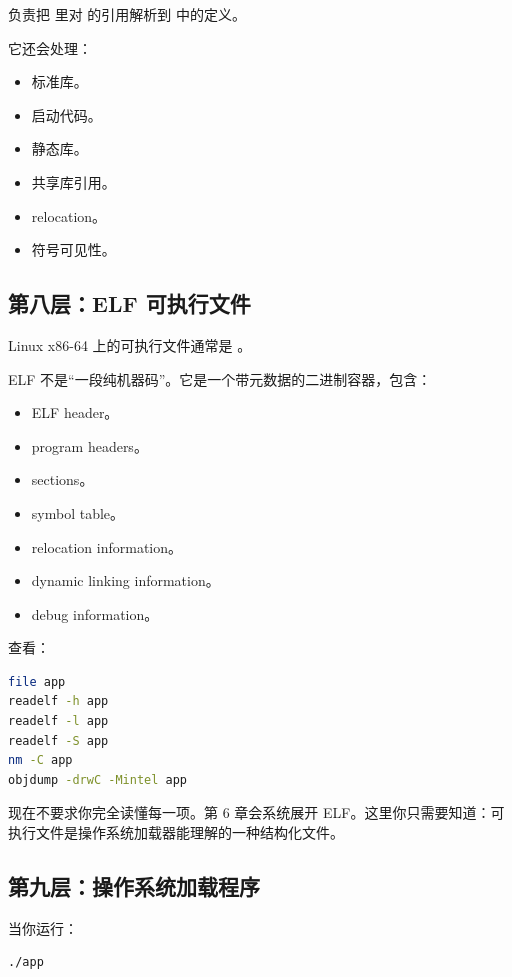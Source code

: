  负责把  里对  的引用解析到  中的定义。

它还会处理：

\begin{itemize}
  \item 标准库。
  \item 启动代码。
  \item 静态库。
  \item 共享库引用。
  \item relocation。
  \item 符号可见性。
\end{itemize}

\subsection{第八层：ELF 可执行文件}

Linux x86-64 上的可执行文件通常是 。

ELF 不是“一段纯机器码”。它是一个带元数据的二进制容器，包含：

\begin{itemize}
  \item ELF header。
  \item program headers。
  \item sections。
  \item symbol table。
  \item relocation information。
  \item dynamic linking information。
  \item debug information。
\end{itemize}

查看：

\begin{lstlisting}[language=bash]
file app
readelf -h app
readelf -l app
readelf -S app
nm -C app
objdump -drwC -Mintel app
\end{lstlisting}

现在不要求你完全读懂每一项。第 6 章会系统展开 ELF。这里你只需要知道：可执行文件是操作系统加载器能理解的一种结构化文件。

\subsection{第九层：操作系统加载程序}

当你运行：

\begin{lstlisting}[language=bash]
./app
\end{lstlisting}

